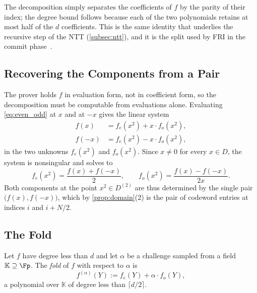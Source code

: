 The decomposition simply separates the coefficients of $f$ by the
parity of their index; the degree bound follows because each of the two
polynomials retains at most half of the $d$ coefficients. This is the
same identity that underlies the recursive step of the NTT
(\cref{subsec:ntt}), and it is the split used by FRI in the commit
phase~\cite[Section~3.9.1]{ethSTARK}.
 
 
\subsection{Recovering the Components from a Pair}
\label{subsec:recovering}
 
The prover holds $f$ in evaluation form, not in coefficient form, so
the decomposition must be computable from evaluations alone. Evaluating
\cref{eq:even_odd} at $x$ and at $-x$ gives the linear
system~\cite[Section~3.9.2]{ethSTARK}
%
\begin{equation}
\label{eq:fold_system}
\begin{aligned}
f(x)  &= f_{e}(x^2) + x \cdot f_{o}(x^2), \\
f(-x) &= f_{e}(x^2) - x \cdot f_{o}(x^2),
\end{aligned}
\end{equation}
%
in the two unknowns $f_{e}(x^2)$ and $f_{o}(x^2)$. Since $x \neq 0$ for
every $x \in D$, the system is nonsingular and solves to
%
\begin{equation}
\label{eq:fold_solve}
f_{e}(x^2) = \frac{f(x) + f(-x)}{2},
\qquad
f_{o}(x^2) = \frac{f(x) - f(-x)}{2x}.
\end{equation}
%
Both components at the point $x^2 \in D^{(2)}$ are thus determined by
the single pair $\bigl(f(x), f(-x)\bigr)$, which by
\cref{prop:domain}(2) is the pair of codeword entries at indices $i$
and $i + N/2$.
 
 
\subsection{The Fold}
\label{subsec:the_fold}
 
\begin{definition}
\label{def:fold}
Let $f$ have degree less than $d$ and let $\alpha$ be a challenge
sampled from a field $\mathbb{K} \supseteq \Fp$. The \emph{fold} of $f$
with respect to $\alpha$ is
%
\begin{equation}
\label{eq:fold}
f^{(\alpha)}(Y) := f_{e}(Y) + \alpha \cdot f_{o}(Y) ,
\end{equation}
%
a polynomial over $\mathbb{K}$ of degree less than $\lceil d/2 \rceil$.
\end{definition}
 
